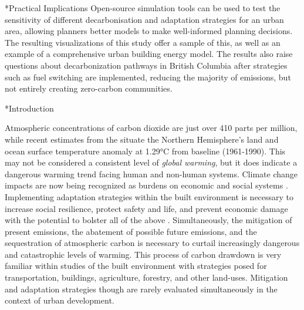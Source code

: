\documentclass[twocolumn, a4paper,10pt]{article}
\makeatletter
\renewcommand\section{\@startsection{section}{1}{\z@}{3pt}{3pt}{\normalfont\large\bfseries}}
\makeatother
\begin{document}
\section*{Practical Implications}
Open-source simulation tools can be used to test the sensitivity of different decarbonisation and adaptation strategies for an urban area, allowing planners better models to make well-informed planning decisions. The resulting visualizations of this study offer a sample of this, as well as an example of a comprehensive urban building energy model. The results also raise questions about decarbonization pathways in British Columbia after strategies such as fuel switching are implemented, reducing the majority of emissions, but not entirely creating zero-carbon communities. 

\section*{Introduction}

Atmospheric concentrations of carbon dioxide are just over 410 parts per million, while recent estimates from the \citet{noauthor_state_2020} situate the Northern Hemisphere’s land and ocean surface temperature anomaly at 1.29°C from baseline (1961-1990). This may not be considered a consistent level of \textit{global warming}, but it does indicate a dangerous warming trend facing human and non-human systems. Climate change impacts are now being recognized as burdens on economic and social systems \citep{frame_climate_2020}. Implementing adaptation strategies within the built environment is necessary to increase social resilience, protect safety and life, and prevent economic damage with the potential to bolster all of the above \citep{schunemann_mitigation_2020}. Simultaneously, the mitigation of present emissions, the abatement of possible future emissions, and the sequestration of atmospheric carbon is necessary to curtail increasingly dangerous and catastrophic levels of warming. This process of carbon drawdown is very familiar within studies of the built environment with strategies posed for transportation, buildings, agriculture, forestry, and other land-uses. Mitigation and adaptation strategies though are rarely evaluated simultaneously in the context of urban development.
\end{document}
